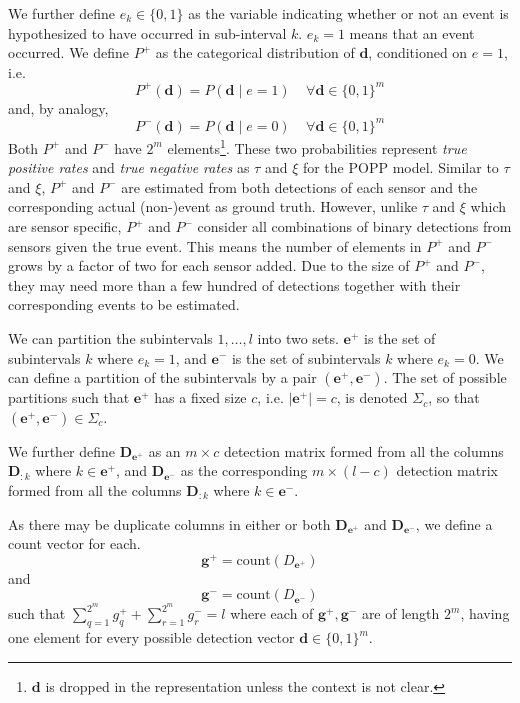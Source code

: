 We further define $e_k \in \{0, 1\}$ as the variable indicating whether or not an event is hypothesized to have occurred in sub-interval $k$. $e_k = 1$ means that an event occurred. We define $P^{+}$ as the categorical distribution of $\mathbf{d}$, conditioned on $e = 1$, i.e.
\begin{equation}
	\label{eq:joint_sensor_model_positive_event}
	P^+(\mathbf{d}) = P(\mathbf{d} \mid e = 1) ~~~~~ \forall \mathbf{d} \in \{0, 1\}^m
\end{equation} 
\noindent and, by analogy,
\begin{equation}
	\label{eq:joint_sensor_model_negative_event}
	P^-(\mathbf{d}) = P(\mathbf{d} \mid e = 0) ~~~~~ \forall \mathbf{d} \in \{0, 1\}^m
\end{equation}
\noindent Both $P^+$ and $P^-$ have $2^m$ elements\footnote{$\mathbf d$ is dropped in the representation unless the context is not clear.}. These two probabilities represent \textit{true positive rates} and \textit{true negative rates}  as $\tau$ and $\xi$ for the POPP model. Similar to $\tau$ and $\xi$, $P^+$ and $P^-$ are estimated from both detections of each sensor and the corresponding actual (non-)event as ground truth. However, unlike $\tau$ and $\xi$ which are sensor specific, $P^+$ and $P^-$ consider all combinations of binary detections from sensors given the true event. This means the number of elements in $P^+$ and $P^-$ grows by a factor of two for each sensor added. Due to the size of $P^+$ and $P^-$, they may need more than a few hundred of detections together with their corresponding events to be estimated.

We can partition the subintervals $1, \ldots, l$ into two sets. $\mathbf{e}^+$ is the set of subintervals $k$ where $e_k = 1$, and $\mathbf{e}^-$ is the set of subintervals $k$ where $e_k = 0$. We can define a partition of the subintervals by a pair $(\mathbf{e}^+, \mathbf{e}^-)$. The set of possible partitions such that $\mathbf{e}^+$ has a fixed size $c$, i.e. $\mid \mathbf{e}^+ \mid = c$, is denoted $\Sigma_c$, so that $(\mathbf{e}^+, \mathbf{e}^-) \in \Sigma_c$.

We further define $\mathbf{D}_{\mathbf{e}^+}$ as an $m \times c$ detection matrix formed from all the columns $\mathbf{D}_{:k}$ where $k \in \mathbf{e}^+$, and $\mathbf{D}_{\mathbf{e}^-}$ as the corresponding $m \times (l - c)$ detection matrix formed from all the columns $\mathbf{D}_{:k}$ where $k \in \mathbf{e}^-$.

As there may be duplicate columns in either or both $\mathbf{D}_{\mathbf{e}^+}$ and $\mathbf{D}_{\mathbf{e}^-}$, we define a count vector for each.
\begin{equation*}
	\mathbf{g}^+ = \textrm{count}(D_{\mathbf{e}^+})
\end{equation*}
\noindent and
\begin{equation*}
	\mathbf{g}^- = \textrm{count}(D_{\mathbf{e}^-})
\end{equation*}
\noindent such that $\sum\limits_{q=1}^{2^m} g_q^+ + \sum\limits_{r=1}^{2^m} g_r^- = l$ where each of $\mathbf{g}^+, \mathbf{g}^-$ are of length $2^m$, having one element for every possible detection vector $\mathbf{d} \in \{0, 1\}^m$.

